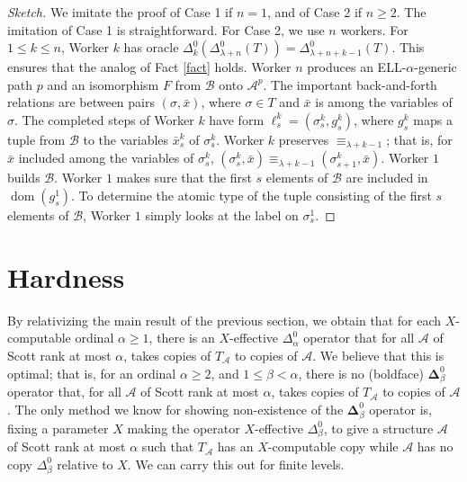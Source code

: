 \documentclass[10pt,a4paper]{article}
\newcommand{\ELL}{\textnormal{ELL}}
\newcommand{\bfDelta}{\boldsymbol{\Delta}}
\DeclareMathOperator{\dom}{dom}
\theoremstyle{definition}
\begin{document}
	\begin{proof} [Sketch]
		
		We imitate the proof of Case 1 if $n=1$, and of Case 2 if $n\geq 2$. The imitation of Case 1 is straightforward. For Case 2, we use $n$ workers. For $1\leq k\leq n$, Worker $k$ has oracle $\Delta^0_k(\Delta^0_{\lambda+n}(T)) = \Delta^0_{\lambda+n+k-1}(T)$. This ensures that the analog of Fact \ref{fact} holds. Worker $n$ produces an \ELL-$\alpha$-generic path $p$ and an isomorphism $F$ from $\mathcal{B}$ onto $\mathcal{A}^p$. The important back-and-forth relations are between pairs $(\sigma,\bar{x})$, where $\sigma\in T$ and $\bar{x}$ is among the variables of $\sigma$. The completed steps of Worker $k$ have form $\ell^k_s = (\sigma^k_s,g^k_s)$, where $g^k_s$ maps a tuple from $\mathcal{B}$ to the variables $\bar{x}^k_s$ of $\sigma^k_s$. Worker $k$ preserves $\equiv_{\lambda + k-1}$; that is, for $\bar{x}$ included among the variables of $\sigma^k_s$, $(\sigma^k_s,\bar{x})\equiv_{\lambda + k-1}(\sigma^k_{s+1},\bar{x})$. 
		Worker $1$ builds $\mathcal{B}$. Worker $1$ makes sure that the first $s$ elements of $\mathcal{B}$ are included in $\dom(g^1_s)$. To determine the atomic type of the tuple consisting of the first $s$ elements of $\mathcal{B}$, Worker $1$ simply looks at the label on $\sigma^1_s$. 
	\end{proof}
	
	\section{Hardness}
	
	By relativizing the main result of the previous section, we obtain that for each $X$-computable ordinal $\alpha\geq 1$, there is an $X$-effective $\Delta^0_\alpha$ operator that for all $\mathcal{A}$ of Scott rank at most $\alpha$, takes copies of $T_\mathcal{A}$ to copies of $\mathcal{A}$. We believe that this is optimal; that is, for an ordinal $\alpha\geq 2$, and $1\leq \beta < \alpha$, there is no (boldface) $\bfDelta^0_\beta$ operator that, for all $\mathcal{A}$ of Scott rank at most $\alpha$, takes copies of $T_\mathcal{A}$ to copies of $\mathcal{A}$. The only method we know for showing non-existence of the $\bfDelta^0_\beta$ operator is, fixing a parameter $X$ making the operator $X$-effective $\Delta^0_\beta$, to give a structure $\mathcal{A}$ of Scott rank at most $\alpha$ such that $T_\mathcal{A}$ has an $X$-computable copy while $\mathcal{A}$ has no copy $\Delta^0_\beta$ relative to $X$. We can carry this out for finite levels.
	
\end{document}
